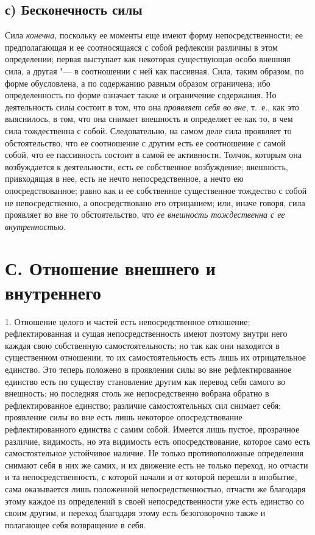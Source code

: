 \subsection[с) Бесконечность силы]{с) Бесконечность силы}

Сила {\em конечна},
поскольку ее моменты еще имеют форму непосредственности; ее предполагающая
и ее соотносящаяся с собой рефлексии различны в этом определении; первая
выступает как некоторая существующая особо внешняя сила, а другая "--- в
соотношении с ней как пассивная. Сила, таким образом, по форме обусловлена,
а по содержанию равным образом ограничена; ибо определенность по форме
означает также и ограничение содержания. Но деятельность силы состоит в
том, что она {\em проявляет себя во вне}, т.~е., как
это выяснилось, в том, что она снимает внешность и определяет ее как то, в
чем сила тождественна с собой. Следовательно, на самом деле сила проявляет
то обстоятельство, что ее соотношение с другим есть ее соотношение с самой
собой, что ее пассивность состоит в самой ее активности. Толчок, которым
она возбуждается к деятельности, есть ее собственное возбуждение;
внешность, привходящая в нее, есть не нечто непосредственное, а нечто ею
опосредствованное; равно как и ее собственное существенное тождество с
собой не непосредственно, а опосредствовано его отрицанием; или, иначе
говоря, сила проявляет во вне то обстоятельство, что
{\em ее внешность тождественна с ее внутренностью}.


\section[С. Отношение внешнего и внутреннего]
{С. Отношение внешнего и внутреннего}

1. Отношение целого и частей есть
непосредственное отношение; рефлектированная и сущая непосредственность
имеют поэтому внутри него каждая свою собственную самостоятельность; но так
как они находятся в существенном отношении, то их самостоятельность есть
лишь их отрицательное единство. Это теперь положено в проявлении силы во
вне рефлектированное единство есть по существу становление другим как
перевод себя самого во внешность; но последняя столь же непосредственно
вобрана обратно в рефлектированное единство; различие самостоятельных сил
снимает себя; проявление силы во вне есть лишь некоторое опосредствование
рефлектированного единства с самим собой. Имеется лишь пустое, прозрачное
различие, видимость, но эта видимость есть опосредствование, которое само
есть самостоятельное устойчивое наличие. Не только противоположные
определения снимают себя в них же самих, и их движение есть не только
переход, но отчасти и та непосредственность, с которой начали и от которой
перешли в инобытие, сама оказывается лишь положенной непосредственностью,
отчасти же благодаря этому каждое из определений в своей непосредственности
уже есть единство со своим другим, и переход благодаря этому есть
безоговорочно также и полагающее себя возвращение в себя.

